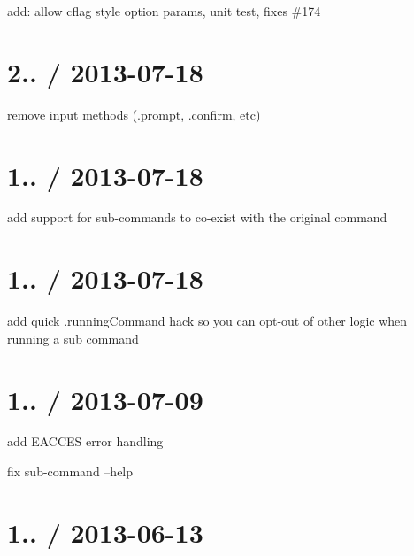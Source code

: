 \begin{DoxyItemize}
\item add\+: allow cflag style option params, unit test, fixes \#174
\end{DoxyItemize}

\section*{2.. / 2013-\/07-\/18 }


\begin{DoxyItemize}
\item remove input methods (.prompt, .confirm, etc)
\end{DoxyItemize}

\section*{1.. / 2013-\/07-\/18 }


\begin{DoxyItemize}
\item add support for sub-\/commands to co-\/exist with the original command
\end{DoxyItemize}

\section*{1.. / 2013-\/07-\/18 }


\begin{DoxyItemize}
\item add quick .running\+Command hack so you can opt-\/out of other logic when running a sub command
\end{DoxyItemize}

\section*{1.. / 2013-\/07-\/09 }


\begin{DoxyItemize}
\item add E\+A\+C\+C\+ES error handling
\item fix sub-\/command --help
\end{DoxyItemize}

\section*{1.. / 2013-\/06-\/13 }


